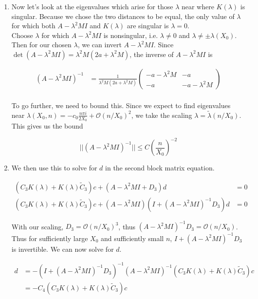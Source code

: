 \documentclass[12pt]{article}
\begin{document}
\begin{enumerate}
\item Now let's look at the eigenvalues which arise for those $\lambda$ near where $K(\lambda)$ is singular. Because we chose the two distances to be equal, the only value of $\lambda$ for which both $A - \lambda^2 M I$ and $K(\lambda)$ are singular is $\lambda = 0$.\\

Choose $\lambda$ for which $A - \lambda^2 M I$ is nonsingular, i.e. $\lambda \neq 0$ and $\lambda \neq \pm \lambda(X_0)$. Then for our chosen $\lambda$, we can invert $A - \lambda^2 M I$. Since $\det(A - \lambda^2 M I) = \lambda^2 M(2 a + \lambda^2 M)$, the inverse of $A - \lambda^2 M I$ is

\begin{align*}
(A - \lambda^2 M I)^{-1} &=
\frac{1}{\lambda^2 M(2a + \lambda^2 M)}
\begin{pmatrix}
-a - \lambda^2 M & -a \\
-a & -a - \lambda^2 M
\end{pmatrix} \\
\end{align*}

To go further, we need to bound this. Since we expect to find eigenvalues near $\lambda(X_0, n) = -c_0 \frac{n \pi i }{2 X_0} + \mathcal{O}(n/X_0)^2$, we take the scaling $\lambda = \tilde{\lambda}(n/X_0)$. This gives us the bound

\[
||(A - \lambda^2 M I)^{-1}||\leq C \left( \frac{n}{X_0} \right)^{-2}
\]

\item We then use this to solve for $d$ in the second block matrix equation.

\begin{align*}
(C_3 K(\lambda) + K(\lambda) \tilde{C}_3) c + (A - \lambda^2 MI + D_3)d &= 0 \\
(C_3 K(\lambda) + K(\lambda) \tilde{C}_3) c + (A - \lambda^2 MI)(I + (A - \lambda^2 MI)^{-1} D_3)d &= 0
\end{align*}

With our scaling, $D_3 = \mathcal{O}(n/X_0)^3$, thus $(A - \lambda^2 MI)^{-1} D_3 = \mathcal{O}(n/X_0)$. Thus for sufficiently large $X_0$ and sufficiently small $n$, $I + (A - \lambda^2 MI)^{-1} D_3$ is invertible. We can now solve for $d$.

\begin{align*}
 d &= 
 -(I + (A - \lambda^2 MI)^{-1} D_3)^{-1}(A - \lambda^2 MI)^{-1}(C_3 K(\lambda) + K(\lambda) \tilde{C}_3) c \\
 &= -C_4 (C_3 K(\lambda) + K(\lambda) \tilde{C}_3) c
\end{align*}


\end{enumerate}
\end{document}
